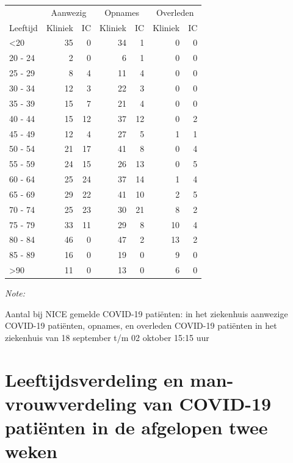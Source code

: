 \documentclass[
  english,
  man,floatsintext]{apa6}
\begin{document}
\begin{table}
\centering\begingroup\fontsize{10}{12}\selectfont

\begin{threeparttable}
\begin{tabular}{lrrrrrr}
\toprule
\multicolumn{1}{c}{ } & \multicolumn{2}{c}{Aanwezig} & \multicolumn{2}{c}{Opnames} & \multicolumn{2}{c}{Overleden} \\
\cmidrule(l{3pt}r{3pt}){2-3} \cmidrule(l{3pt}r{3pt}){4-5} \cmidrule(l{3pt}r{3pt}){6-7}
Leeftijd & Kliniek & IC & Kliniek & IC & Kliniek & IC\\
\midrule
<20 & 35 & 0 & 34 & 1 & 0 & 0\\
20 - 24 & 2 & 0 & 6 & 1 & 0 & 0\\
25 - 29 & 8 & 4 & 11 & 4 & 0 & 0\\
30 - 34 & 12 & 3 & 22 & 3 & 0 & 0\\
35 - 39 & 15 & 7 & 21 & 4 & 0 & 0\\
40 - 44 & 15 & 12 & 37 & 12 & 0 & 2\\
45 - 49 & 12 & 4 & 27 & 5 & 1 & 1\\
50 - 54 & 21 & 17 & 41 & 8 & 0 & 4\\
55 - 59 & 24 & 15 & 26 & 13 & 0 & 5\\
60 - 64 & 25 & 24 & 37 & 14 & 1 & 4\\
65 - 69 & 29 & 22 & 41 & 10 & 2 & 5\\
70 - 74 & 25 & 23 & 30 & 21 & 8 & 2\\
75 - 79 & 33 & 11 & 29 & 8 & 10 & 4\\
80 - 84 & 46 & 0 & 47 & 2 & 13 & 2\\
85 - 89 & 16 & 0 & 19 & 0 & 9 & 0\\
>90 & 11 & 0 & 13 & 0 & 6 & 0\\
\bottomrule
\end{tabular}
\begin{tablenotes}
\item \textit{Note: } 
\item Aantal bij NICE gemelde COVID-19 patiënten: in het ziekenhuis aanwezige COVID-19 patiënten, opnames, en overleden COVID-19 patiënten in het ziekenhuis van 18 september t/m 02 oktober 15:15 uur
\end{tablenotes}
\end{threeparttable}
\endgroup{}
\end{table}

\newpage

\hypertarget{leeftijdsverdeling-en-man-vrouwverdeling-van-covid-19-patiuxebnten-in-de-afgelopen-twee-weken}{%
\section{Leeftijdsverdeling en man-vrouwverdeling van COVID-19 patiënten in de afgelopen twee weken}\label{leeftijdsverdeling-en-man-vrouwverdeling-van-covid-19-patiuxebnten-in-de-afgelopen-twee-weken}}
\end{document}
